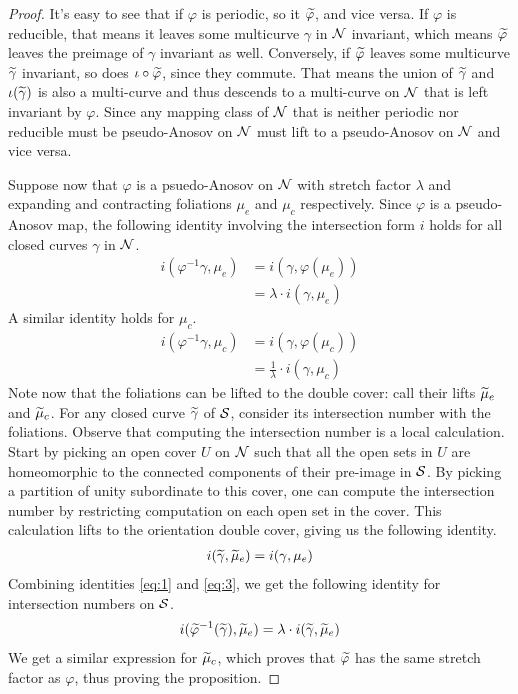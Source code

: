 \begin{proof}
  It's easy to see that if $\varphi$ is periodic, so it $\widetilde{\varphi}$, and vice versa. If $\varphi$
  is reducible, that means it leaves some multicurve $\gamma$ in $\mathcal{N}$ invariant, which means $\widetilde{\varphi}$ leaves
  the preimage of $\gamma$ invariant as well. Conversely, if $\widetilde{\varphi}$ leaves some multicurve
  $\widetilde{\gamma}$ invariant, so does $\iota \circ \widetilde{\varphi}$, since they commute. That means the union of $\widetilde{\gamma}$
  and $\iota(\widetilde{\gamma})$ is also a multi-curve and thus descends to a multi-curve on $\mathcal{N}$ that is left invariant
  by $\varphi$. Since any mapping class of $\mathcal{N}$ that is neither periodic nor reducible must be pseudo-Anosov on $\mathcal{N}$ must lift to a pseudo-Anosov on $\mathcal{N}$
  and vice versa.

  Suppose now that $\varphi$ is a psuedo-Anosov on $\mathcal{N}$ with stretch factor $\lambda$ and expanding and contracting
  foliations $\mu_e$ and $\mu_c$ respectively. Since $\varphi$ is a pseudo-Anosov map, the following
  identity involving the intersection form $i$ holds for all closed curves $\gamma$ in $\mathcal{N}$.
  \begin{align}
    \label{eq:1}
    i(\varphi^{-1}\gamma, \mu_e) &= i(\gamma, \varphi(\mu_e)) \\
                               &= \lambda \cdot i(\gamma, \mu_e)
  \end{align}
  A similar identity holds for $\mu_c$.
  \begin{align}
    \label{eq:2}
    i(\varphi^{-1}\gamma, \mu_c) &= i(\gamma, \varphi(\mu_c)) \\
                               &= \frac{1}{\lambda} \cdot i(\gamma, \mu_c)
  \end{align}
  Note now that the foliations can be lifted to the double cover: call their lifts $\widetilde{\mu}_e$ and
  $\widetilde{\mu}_c$. For any closed curve $\widetilde{\gamma}$ of $\mathcal{S}$, consider its intersection number with the
  foliations. Observe that computing the intersection number is a local calculation. Start by picking an open
  cover $U$ on $\mathcal{N}$ such that all the open sets in $U$ are homeomorphic to the connected components of their
  pre-image in $\mathcal{S}$. By picking a partition of unity subordinate to this cover, one can compute the intersection
  number by restricting computation on each open set in the cover. This calculation lifts to the orientation double
  cover, giving us the following identity.
  \begin{align}
    \label{eq:3}
    i(\widetilde{\gamma}, \widetilde{\mu}_e) = i(\gamma, \mu_e)
  \end{align}
  Combining identities \eqref{eq:1} and \eqref{eq:3}, we get the following identity for intersection numbers
  on $\mathcal{S}$.
  \begin{align*}
    i(\widetilde{\varphi}^{-1} (\widetilde{\gamma}), \widetilde{\mu}_e) = \lambda \cdot i(\widetilde{\gamma}, \widetilde{\mu}_e)
  \end{align*}
  We get a similar expression for $\widetilde{\mu}_c$, which proves that $\widetilde{\varphi}$ has the same stretch factor
  as $\varphi$, thus proving the proposition.
\end{proof}
